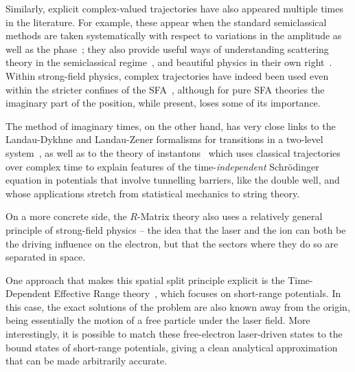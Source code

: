 Similarly, explicit complex-valued trajectories have also appeared multiple times in the literature. For example, these appear when the standard semiclassical methods are taken systematically with respect to variations in the amplitude as well as the phase~\cite{goldfarb-tannor_bohmian-complex_2006, goldfarb-tannor_complex-trajectory-wkb_2008, schiff-tannor_path-integral-complex-trajectory_2011}; they also provide useful ways of understanding scattering theory in the semiclassical regime~\cite{ miller_semiclassical-collisions_1972, pechukas_analytic_1976, hwang_adiabatic_1977}, and beautiful physics in their own right~\cite{anderson_complex-classical-trajectories_2012}. Within strong-field physics, complex trajectories have indeed been used even within the stricter confines of the SFA~\cite{salieres_quantum_orbits, kopold_quantum-orbits_2002, milosevic_quantum-orbit_2006}, although for pure SFA theories the imaginary part of the position, while present, loses some of its importance.




The method of imaginary times, on the other hand, has very close links to the Landau-Dykhne and Landau-Zener formalisms for transitions in a two-level system~\cite{landau_QM, dykhne_adiabatic_1962, wittig_landau-zener_2005}, as well as to the theory of instantons~\cite{zinn_instantons_1987} which uses classical trajectories over complex time to explain features of the time-\textit{independent} Schrödinger equation in potentials that involve tunnelling barriers, like the double well, and whose applications stretch from statistical mechanics to string theory.


On a more concrete side, the $R$-Matrix theory also uses a relatively general principle of strong-field physics -- the idea that the laser and the ion can both be the driving influence on the electron, but that the sectors where they do so are separated in space.

One approach that makes this spatial split principle explicit is the Time-Dependent Effective Range theory~\cite{frolov_model-independent_2003, frolov_effective-range-theory_2008}, which focuses on short-range potentials. In this case, the exact solutions of the problem are also known away from the origin, being essentially the motion of a free particle under the laser field. More interestingly, it is possible to match these free-electron laser-driven states to the bound states of short-range potentials, giving a clean analytical approximation that can be made arbitrarily accurate.

